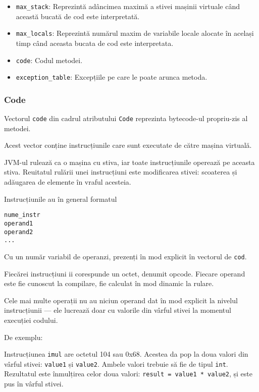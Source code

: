 \begin{itemize}
	\tightlist
	\item
	      \texttt{max\_stack}: Reprezintă adâncimea maximă a stivei mașinii
	      virtuale când această bucată de cod este interpretată.
	\item
	      \texttt{max\_locals}: Reprezintă numărul maxim de variabile locale
	      alocate în același timp când aceasta bucata de cod este interpretata.
	\item
	      \texttt{code}: Codul metodei.
	\item
	      \texttt{exception\_table}: Excepțiile pe care le poate arunca metoda.
\end{itemize}

\subsubsection{Code}

Vectorul \texttt{code} din cadrul atributului \texttt{Code} reprezinta
bytecode-ul propriu-zis al metodei.

Acest vector conține instrucțiunile care sunt executate de către mașina
virtuală.

JVM-ul rulează ca o mașina cu stiva, iar toate instrucțiunile operează
pe aceasta stiva. Reuitatul rulării unei instrucțiuni este modificarea
stivei: scoaterea și adăugarea de elemente în vraful acesteia.

Instrucțiunile au în general formatul~\cite{instruction_format}

\begin{verbatim}
nume_instr
operand1
operand2
...
\end{verbatim}

Cu un număr variabil de operanzi, prezenți în mod explicit în vectorul
de \texttt{cod}.

Fiecărei instrucțiuni ii corespunde un octet, denumit opcode. Fiecare
operand este fie cunoscut la compilare, fie calculat în mod dinamic la
rulare.

Cele mai multe operații nu au niciun operand dat în mod explicit la
nivelul instrucțiunii --- ele lucrează doar cu valorile din vârful stivei
la momentul execuției codului.

De exemplu:

Instrucțiunea \texttt{imul} are octetul 104 sau 0x68.
Acestea da pop la doua valori din vârful stivei: \texttt{value1} și
\texttt{value2}. Ambele valori trebuie să fie de tipul \texttt{int}.
Rezultatul este înmulțirea celor doua valori:
\texttt{result\ =\ value1\ *\ value2}, și este pus în vârful stivei.

